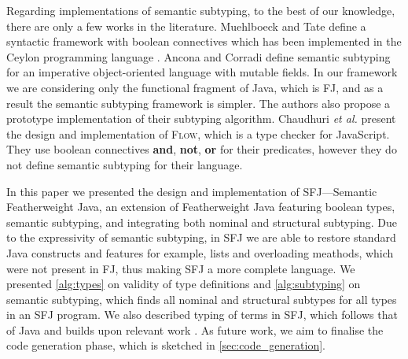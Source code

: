 \documentclass[runningheads]{llncs}
\begin{document}
Regarding implementations of semantic subtyping, to the best of our knowledge, there are only a few works in the literature.
%
Muehlboeck and Tate \cite{Muehlboeck2018} define a syntactic framework with boolean connectives which has been implemented in the Ceylon programming language \cite{Ceylon2016}.
%
Ancona and Corradi \cite{AnconaC16} define semantic subtyping for an imperative object-oriented language with mutable fields. In our framework we are considering only the functional fragment of Java, which is FJ, and as a result the semantic subtyping framework is simpler. The authors also propose a prototype implementation of their subtyping algorithm.
%
Chaudhuri \emph{et al.} \cite{ChaudhuriVGRL17} present the design and implementation of \textsc{Flow}, which is a type checker for JavaScript. They use boolean connectives \textbf{and}, \textbf{not}, \textbf{or} for their predicates, however they do not define semantic subtyping for their language.

In this paper we presented the design and implementation of SFJ---Semantic Featherweight Java, an extension of Featherweight Java featuring boolean types, semantic subtyping, and integrating both nominal and structural subtyping. Due to the expressivity of semantic subtyping, in SFJ we are able to restore standard Java constructs and features for example, lists and overloading meathods, which were not present in FJ, thus making SFJ a more complete language.
We presented \autoref{alg:types} on validity of type definitions and
\autoref{alg:subtyping} on semantic subtyping, which finds all nominal and structural subtypes for all types in an SFJ program. We also described typing of terms in SFJ, which follows that of Java and builds upon relevant work \cite{Dardha2013,Dardha2017}.
As future work, we aim to finalise the code generation phase, which is sketched in \autoref{sec:code_generation}.



\end{document}
